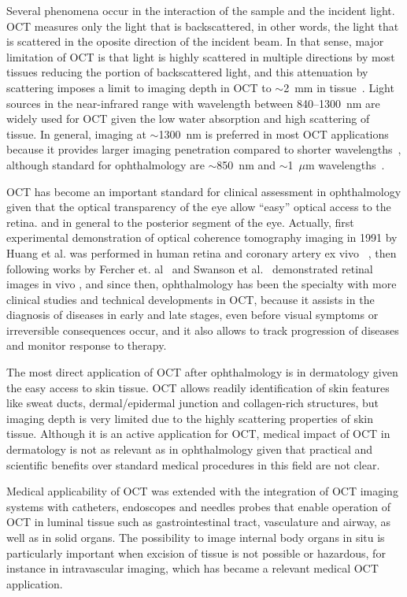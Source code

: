 Several phenomena occur in the interaction of the sample and the incident light. OCT measures only the light that is backscattered, in other words, the light that is scattered in the oposite direction of the incident beam. In that sense, major limitation of OCT is that light is highly scattered in multiple directions by most tissues reducing the portion of backscattered light, and this attenuation by scattering imposes a limit to imaging depth in OCT to $\sim$2~mm in tissue~\cite{}. Light sources in the near-infrared range with wavelength between 840--1300~nm are widely used for OCT given the low water absorption and high scattering of tissue. In general, imaging at $\sim$1300~nm is preferred in most OCT applications because it provides larger imaging penetration compared to shorter wavelengths~\cite{}, although standard for ophthalmology are $\sim$850~nm and $\sim$1~$\mu$m wavelengths~\cite{}.

OCT has become an important standard for clinical assessment in ophthalmology given that the optical transparency of the eye allow ``easy'' optical access to the retina. and in general to the posterior segment of the eye. Actually, first experimental demonstration of optical coherence tomography imaging in 1991 by Huang et al. was performed in human retina and coronary artery ex vivo ~\cite{}, then following works by Fercher et. al~\cite{} and Swanson et al.~\cite{} demonstrated retinal images in vivo , and since then, ophthalmology has been the specialty with more clinical studies and technical developments in OCT, because it assists in the diagnosis of diseases in early and late stages, even before visual symptoms or irreversible consequences occur, and it also allows to track progression of diseases and monitor response to therapy.

The most direct application of OCT after ophthalmology is in dermatology given the easy access to skin tissue. OCT allows readily identification of skin features like sweat ducts, dermal/epidermal junction and collagen-rich structures, but imaging depth is very limited due to the highly scattering properties of skin tissue. Although it is an active application for OCT, medical impact of OCT in dermatology is not as relevant as in ophthalmology given that practical and scientific benefits over standard medical procedures in this field are not clear.

Medical applicability of OCT was extended with the integration of OCT imaging systems with catheters, endoscopes and needles probes that enable operation of OCT in luminal tissue such as gastrointestinal tract, vasculature and airway, as well as in solid organs. The possibility to image internal body organs in situ is particularly important when excision of tissue is not possible or hazardous, for instance in intravascular imaging, which has became a relevant medical OCT application.

